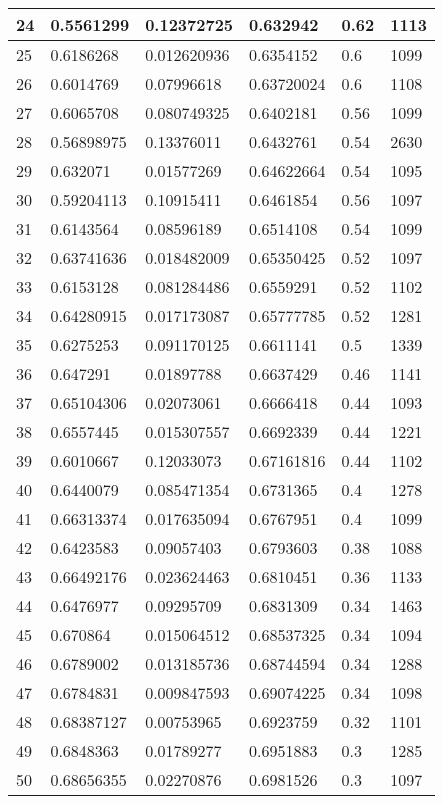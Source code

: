 \begin{longtable}{|l|l|l|l|l|l|}
24 & 0.5561299 & 0.12372725 & 0.632942 & 0.62 & 1113 \\ \hline 
25 & 0.6186268 & 0.012620936 & 0.6354152 & 0.6 & 1099 \\ \hline 
26 & 0.6014769 & 0.07996618 & 0.63720024 & 0.6 & 1108 \\ \hline 
27 & 0.6065708 & 0.080749325 & 0.6402181 & 0.56 & 1099 \\ \hline 
28 & 0.56898975 & 0.13376011 & 0.6432761 & 0.54 & 2630 \\ \hline 
29 & 0.632071 & 0.01577269 & 0.64622664 & 0.54 & 1095 \\ \hline 
30 & 0.59204113 & 0.10915411 & 0.6461854 & 0.56 & 1097 \\ \hline 
31 & 0.6143564 & 0.08596189 & 0.6514108 & 0.54 & 1099 \\ \hline 
32 & 0.63741636 & 0.018482009 & 0.65350425 & 0.52 & 1097 \\ \hline 
33 & 0.6153128 & 0.081284486 & 0.6559291 & 0.52 & 1102 \\ \hline 
34 & 0.64280915 & 0.017173087 & 0.65777785 & 0.52 & 1281 \\ \hline 
35 & 0.6275253 & 0.091170125 & 0.6611141 & 0.5 & 1339 \\ \hline 
36 & 0.647291 & 0.01897788 & 0.6637429 & 0.46 & 1141 \\ \hline 
37 & 0.65104306 & 0.02073061 & 0.6666418 & 0.44 & 1093 \\ \hline 
38 & 0.6557445 & 0.015307557 & 0.6692339 & 0.44 & 1221 \\ \hline 
39 & 0.6010667 & 0.12033073 & 0.67161816 & 0.44 & 1102 \\ \hline 
40 & 0.6440079 & 0.085471354 & 0.6731365 & 0.4 & 1278 \\ \hline 
41 & 0.66313374 & 0.017635094 & 0.6767951 & 0.4 & 1099 \\ \hline 
42 & 0.6423583 & 0.09057403 & 0.6793603 & 0.38 & 1088 \\ \hline 
43 & 0.66492176 & 0.023624463 & 0.6810451 & 0.36 & 1133 \\ \hline 
44 & 0.6476977 & 0.09295709 & 0.6831309 & 0.34 & 1463 \\ \hline 
45 & 0.670864 & 0.015064512 & 0.68537325 & 0.34 & 1094 \\ \hline 
46 & 0.6789002 & 0.013185736 & 0.68744594 & 0.34 & 1288 \\ \hline 
47 & 0.6784831 & 0.009847593 & 0.69074225 & 0.34 & 1098 \\ \hline 
48 & 0.68387127 & 0.00753965 & 0.6923759 & 0.32 & 1101 \\ \hline 
49 & 0.6848363 & 0.01789277 & 0.6951883 & 0.3 & 1285 \\ \hline 
50 & 0.68656355 & 0.02270876 & 0.6981526 & 0.3 & 1097 \\ \hline 
\end{longtable}